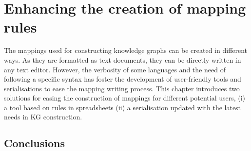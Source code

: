 
\chapter{Enhancing the creation of mapping rules}
\label{chapter:creation}

The mappings used for constructing knowledge graphs can be created in different ways. As they are formatted as text documents, they can be directly written in any text editor. However, the verbosity of some languages and the need of following a specific syntax has foster the development of user-friendly tools and serialisations to ease the mapping writing process. This chapter introduces two solutions for easing the construction of mappings for different potential users, (i) a tool based on rules in spreadsheets (ii) a serialisation updated with the latest needs in KG construction.





\section{Conclusions}